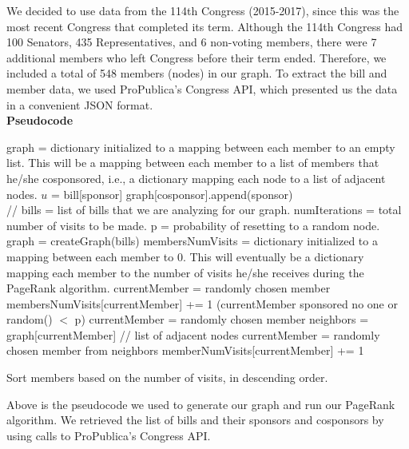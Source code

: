 \documentclass[11pt]{article}
\begin{document}
We decided to use data from the 114th Congress (2015-2017), since this was the most recent Congress that completed its term. Although the 114th Congress had 100 Senators, 435 Representatives, and 6 non-voting members, there were 7 additional members who left Congress before their term ended. Therefore, we included a total of 548 members (nodes) in our graph. To extract the bill and member data, we used ProPublica's Congress API, which presented us the data in a convenient JSON format. \\





\textbf{Pseudocode}

\begin{algorithmic}[1]
\State graph = dictionary initialized to a mapping between each member to an empty list. This will be a mapping between each member to a list of members that he/she cosponsored, i.e., a dictionary mapping each node to a list of adjacent nodes. 
	\State $u$ = bill[sponsor]
		\State graph[cosponsor].append(sponsor)
	\EndFor 
\EndFor
\EndProcedure\\


 // bills = list of bills that we are analyzing for our graph. numIterations = total number of visits to be made. p = probability of resetting to a random node. 
\State graph = createGraph(bills) 
\State membersNumVisits = dictionary initialized to a mapping between each member to 0. This will eventually be a dictionary mapping each member to the number of visits he/she receives during the PageRank algorithm. 
\State currentMember = randomly chosen member
\State membersNumVisits[currentMember] += 1
	\If (currentMember sponsored no one or random() $<$ p)
		\State currentMember = randomly chosen member
	\Else
		\State neighbors = graph[currentMember] // list of adjacent nodes
		\State currentMember = randomly chosen member from neighbors
	\EndIf
	\State memberNumVisits[currentMember] += 1

\EndFor
\State Sort members based on the number of visits, in descending order. 
\EndProcedure
\end{algorithmic}

Above is the pseudocode we used to generate our graph and run our PageRank algorithm. We retrieved the list of bills and their sponsors and cosponsors by using calls to ProPublica's Congress API. 
\end{document}
